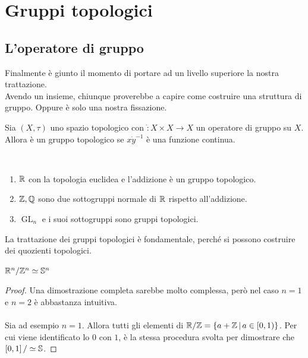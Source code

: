 \section{Gruppi topologici}
\subsection{\textcolor{TopGener}{\textbf{L'operatore di gruppo}}}
Finalmente è giunto il momento di portare ad un livello superiore la nostra trattazione. \\ Avendo un insieme, chiunque proverebbe a capire come costruire una struttura di gruppo. Oppure è solo una nostra fissazione.



\begin{definition}
	Sia $(X, \tau)$ uno spazio topologico con $\dot \colon X \times X \rightarrow X$ un operatore di gruppo su $X$. \\ Allora è un gruppo topologico se $x \dot y^{-1}$ è una funzione continua. %
\end{definition}

\begin{example} \
\begin{enumerate}
	\item $\R$ con la topologia euclidea e l'addizione è un gruppo topologico.
	\item $\Z, \Q$ sono due sottogruppi normale di $\R$ rispetto all'addizione. 
	\item $\operatorname{GL}_n$ e i suoi sottogruppi sono gruppi topologici.
\end{enumerate}
\end{example}

La trattazione dei gruppi topologici è fondamentale, perché si possono costruire dei quozienti topologici.
\begin{theorem}
	$\R^n / \Z^n \simeq \S^n$
\end{theorem}
\begin{proof}
	Una dimostrazione completa sarebbe molto complessa, però nel caso $n=1$ e $n=2$ è abbastanza intuitiva. \\ \\
	
	Sia ad esempio $n=1$. Allora tutti gli elementi di $\R / \Z = \left\{a + \Z \,\middle|\, a \in \left[0,1\right) \right\}$. 
	Per cui viene identificato lo $0$ con $1$, è la stessa procedura svolta per dimostrare che $\left[0,1\right]/ \simeq \S$. 
\end{proof}
